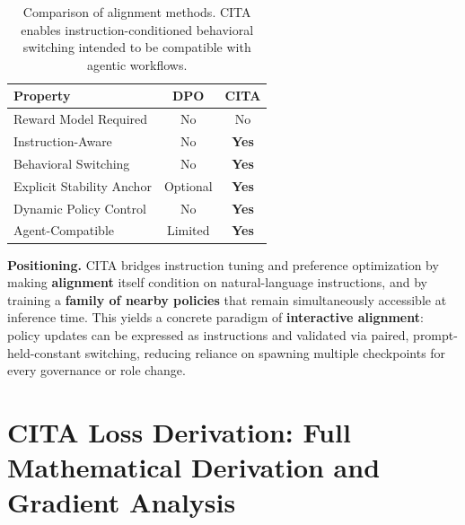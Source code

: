 \vspace{-2mm}
\begin{table}[ht!]
\centering
\small
\renewcommand{\arraystretch}{1.2}
\begin{tabular}{@{}lcc@{}}
\toprule
\textbf{Property} & \textbf{DPO} & \textbf{CITA} \\
\midrule
Reward Model Required & No & No \\ \hline
Instruction-Aware & No & \textbf{Yes} \\ \hline
Behavioral Switching & No & \textbf{Yes} \\ \hline
Explicit Stability Anchor & Optional & \textbf{Yes} \\ \hline
Dynamic Policy Control & No & \textbf{Yes} \\ \hline
Agent-Compatible & Limited & \textbf{Yes} \\
\bottomrule
\end{tabular}
\caption{Comparison of alignment methods. CITA enables instruction-conditioned behavioral switching intended to be compatible with agentic workflows.}
\label{tab:method_comparison}
\vspace{-4mm}
\end{table}

\noindent\textbf{Positioning.}
CITA bridges instruction tuning and preference optimization by making \textbf{alignment} itself condition on natural-language instructions, and by training a \textbf{family of nearby policies} that remain simultaneously accessible at inference time. This yields a concrete paradigm of \textbf{interactive alignment}: policy updates can be expressed as instructions and validated via paired, prompt-held-constant switching, reducing reliance on spawning multiple checkpoints for every governance or role change.





\section{CITA Loss Derivation: Full Mathematical Derivation and Gradient Analysis}
\label{sec:appendix_cita_kl}

\vspace{-0.35em}
